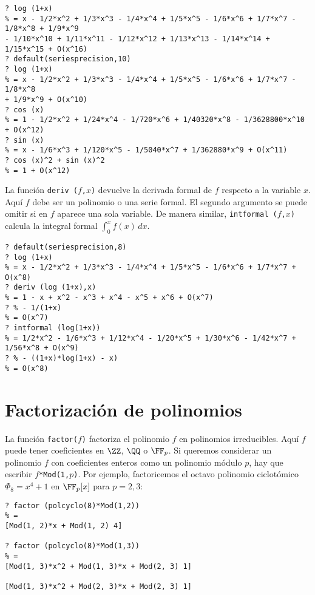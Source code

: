 \begin{framed}\footnotesize
\begin{verbatim}
? log (1+x)
% = x - 1/2*x^2 + 1/3*x^3 - 1/4*x^4 + 1/5*x^5 - 1/6*x^6 + 1/7*x^7 - 1/8*x^8 + 1/9*x^9
- 1/10*x^10 + 1/11*x^11 - 1/12*x^12 + 1/13*x^13 - 1/14*x^14 + 1/15*x^15 + O(x^16)
? default(seriesprecision,10)
? log (1+x)
% = x - 1/2*x^2 + 1/3*x^3 - 1/4*x^4 + 1/5*x^5 - 1/6*x^6 + 1/7*x^7 - 1/8*x^8
+ 1/9*x^9 + O(x^10)
? cos (x)
% = 1 - 1/2*x^2 + 1/24*x^4 - 1/720*x^6 + 1/40320*x^8 - 1/3628800*x^10 + O(x^12)
? sin (x)
% = x - 1/6*x^3 + 1/120*x^5 - 1/5040*x^7 + 1/362880*x^9 + O(x^11)
? cos (x)^2 + sin (x)^2
% = 1 + O(x^12)
\end{verbatim}
\end{framed}

La función \texttt{deriv\,($f$,$x$)} devuelve la derivada formal de $f$ respecto
a la variable $x$. Aquí $f$ debe ser un polinomio o una serie formal. El segundo
argumento se puede omitir si en $f$ aparece una sola variable. De manera
similar, \texttt{intformal\,($f$,$x$)} calcula la integral formal
$\int_0^x f (x)\,dx$.

\begin{framed}\footnotesize
\begin{verbatim}
? default(seriesprecision,8)
? log (1+x)
% = x - 1/2*x^2 + 1/3*x^3 - 1/4*x^4 + 1/5*x^5 - 1/6*x^6 + 1/7*x^7 + O(x^8)
? deriv (log (1+x),x)
% = 1 - x + x^2 - x^3 + x^4 - x^5 + x^6 + O(x^7)
? % - 1/(1+x)
% = O(x^7)
? intformal (log(1+x))
% = 1/2*x^2 - 1/6*x^3 + 1/12*x^4 - 1/20*x^5 + 1/30*x^6 - 1/42*x^7 + 1/56*x^8 + O(x^9)
? % - ((1+x)*log(1+x) - x)
% = O(x^8)
\end{verbatim}
\end{framed}


\section{Factorización de polinomios}

La función \texttt{factor($f$)} factoriza el polinomio $f$ en polinomios
irreducibles. Aquí $f$ puede tener coeficientes en $\ZZ$, $\QQ$ o $\FF_p$.
Si queremos considerar un polinomio $f$ con coeficientes enteros como un
polinomio módulo $p$, hay que escribir \texttt{$f$*Mod(1,$p$)}. Por ejemplo,
factoricemos el octavo polinomio ciclotómico $\Phi_8 = x^4+1$ en $\FF_p [x]$
para $p = 2,3$:

\begin{framed}\footnotesize
\begin{verbatim}
? factor (polcyclo(8)*Mod(1,2))
% = 
[Mod(1, 2)*x + Mod(1, 2) 4]

? factor (polcyclo(8)*Mod(1,3))
% = 
[Mod(1, 3)*x^2 + Mod(1, 3)*x + Mod(2, 3) 1]

[Mod(1, 3)*x^2 + Mod(2, 3)*x + Mod(2, 3) 1]

\end{verbatim}
\end{framed}

